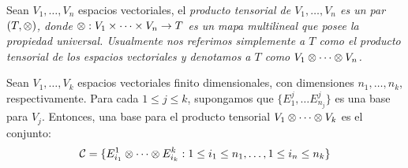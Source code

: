\begin{definition}
	Sean $V_1, \ldots, V_n$ espacios vectoriales, el \it{producto tensorial} de
	$V_1,\ldots,V_n$ es un par $(T, \otimes)$, donde $\otimes: V_1 \times \cdots \times
		V_n \to T$ es un mapa multilineal que posee la propiedad universal. Usualmente
	nos referimos simplemente a $T$ como el producto tensorial de los espacios
	vectoriales y denotamos a $T$ como $V_1 \otimes \cdots \otimes V_n$.
\end{definition}

\begin{theorem}
	\label{Teorema: Base para el producto tensorial}
	Sean $V_1, \ldots, V_k$ espacios vectoriales finito dimensionales, con
	dimensiones $n_1, \ldots, n_k$, respectivamente. Para cada $1 \leq j \leq k$,
	supongamos que $\{E_{1}^{j}, \ldots E_{n_j}^{j}\}$ es una base para $V_j$.
	Entonces, una base para el producto tensorial $V_1 \otimes \cdots \otimes V_k$ es
	el conjunto:
	\[
		\mathcal{C} = \{ E_{i_1}^{1} \otimes \cdots \otimes E_{i_k}^{k} :
		1 \leq i_1 \leq n_1, \ldots, 1 \leq i_n \leq n_k \}
	\]
\end{theorem}

